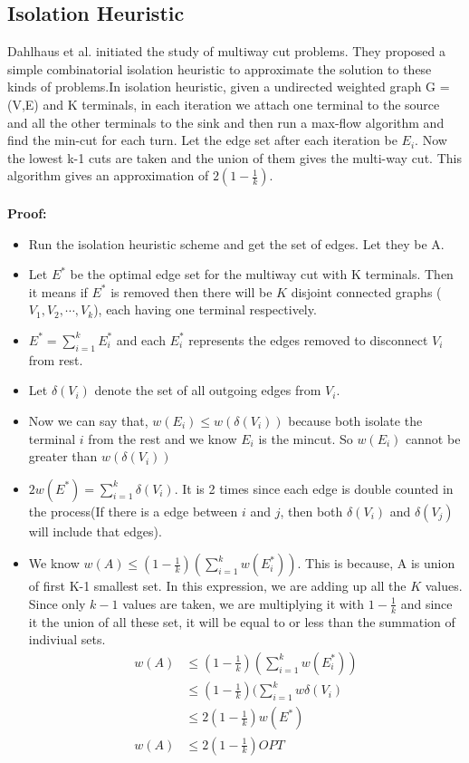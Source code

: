 \documentclass[11pt]{article}
\begin{document}
\subsection{Isolation Heuristic}
Dahlhaus et al.\cite{Dahlhaus} initiated the study of multiway cut problems. They proposed a simple combinatorial isolation heuristic to approximate the solution to these kinds of problems.In isolation heuristic, given a undirected weighted graph G = (V,E) and K terminals, in each iteration we attach one terminal to the source and all the other terminals to the sink and then run a max-flow algorithm and find the min-cut for each turn. Let the edge set after each iteration be $E_i$. Now the lowest k-1 cuts are taken and the union of them gives the multi-way cut. This algorithm gives an approximation of $2(1-\frac{1}{k})$.\\\\
\textbf{Proof:}
\begin{itemize}
    \item Run the isolation heuristic scheme and get the set of edges. Let they be A.
    \item Let $E^*$ be the optimal edge set for the multiway cut with K terminals. Then it means if $E^*$ is removed then there will be $K$ disjoint connected graphs ($V_1, V_2,\cdots,V_k$), each having one terminal respectively.
    \item $E^* = \sum\limits_{i=1}^{k}{E_i^*}$ and each $E_i^*$ represents the edges removed to disconnect $V_i$ from rest.
    \item Let $\delta(V_i)$ denote the set of all outgoing edges from $V_i$.
    \item Now we can say that, $w(E_i) \le w(\delta(V_i))$ because both isolate the terminal $i$ from the rest and we know $E_i$ is the mincut. So $w(E_i)$ cannot be greater than $w(\delta(V_i))$
    \item $2w(E^*) = \sum\limits_{i=1}^{k}{\delta(V_i)} $. It is 2 times since each edge is double counted in the process(If there is a edge between $i$ and $j$, then both $\delta(V_i)$ and $\delta(V_j)$ will include that edges).
    \item We know $w(A) \le (1 -\frac{1}{k})(\sum\limits_{i=1}^k w(E_i^*))$. This is because, A is union of first K-1 smallest set. In this expression, we are adding up all the $K$ values. Since only $k-1$ values are taken, we are multiplying it with $1 - \frac{1}{k}$ and since it the union of all these set, it will be equal to or less than the summation of indiviual sets.
        \begin{align*}
            w(A) &\le (1 -\frac{1}{k})(\sum\limits_{i=1}^k w(E_i^*)) \\
            &\le (1 -\frac{1}{k})(\sum\limits_{i=1}^k w{\delta(V_i)}\\
            &\le 2(1 -\frac{1}{k})w(E^*)\\
          w(A)  &\le 2(1 -\frac{1}{k}) OPT
        \end{align*}
\end{itemize}
\end{document}
